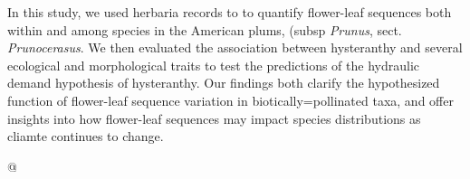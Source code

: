 \documentclass{article}\usepackage[]{graphicx}\usepackage[]{color}
\begin{document}
\noindent In this study, %
we used herbaria records to to quantify flower-leaf sequences both within and among species in the American plums, (subsp \textit{Prunus}, sect. \textit{Prunocerasus}. We then evaluated the association between hysteranthy and several ecological and morphological traits to test the predictions of the hydraulic demand hypothesis of hysteranthy. Our findings both clarify the hypothesized function of flower-leaf sequence variation in biotically=pollinated taxa, and offer insights into how flower-leaf sequences may impact species distributions as cliamte continues to change.




@



\end{document}
